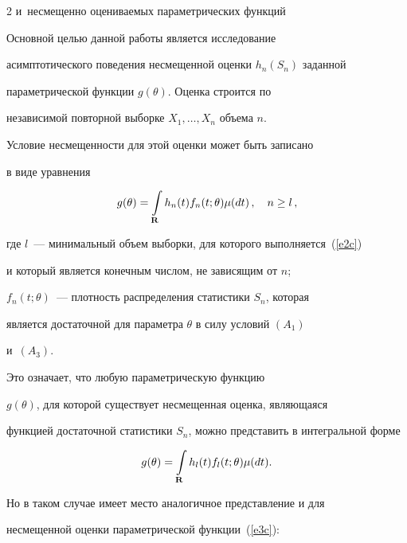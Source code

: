 \begin{multicols}{2}
{и~несмещенно оцениваемых параметрических функций}





  Основной целью данной работы является исследование


  асимптотического поведения несмещенной оценки $h_n(S_n)$ заданной


  параметрической функции $g(\theta)$. Оценка  строится по


  независимой повторной выборке $X_1,\ldots,X_n$ объема $n$.





   Условие несмещенности для этой оценки может быть записано


  в виде уравнения


\begin{equation}


g(\theta)=\intp h_n(t) f_n(t;\theta) \mu(dt)\,,\quad n\ge l\,,


   \label{e2c}


\end{equation}


  где $l$~--- минимальный объем выборки, для которого выполняется~(\ref{e2c})


  и который является конечным числом, не зависящим от $n$;


  $f_n(t;\theta)$~--- плотность распределения статистики $S_n$, которая


  является достаточной для параметра $\theta$ в силу условий $(A_1)$ 


  и~$(A_3)$.


  Это означает, что любую параметрическую функцию


  $g(\theta)$, для которой существует несмещенная оценка, являющаяся


  функцией достаточной статистики $S_n$, можно представить в интегральной форме


  \begin{equation} 


g(\theta)=\intp h_l(t) f_l(t;\theta) \mu(dt).


      \label{e3c}


  \end{equation}





   Но в таком случае имеет место аналогичное представление и для


  несмещенной оценки параметрической функции~(\ref{e3c}):



\end{multicols}

